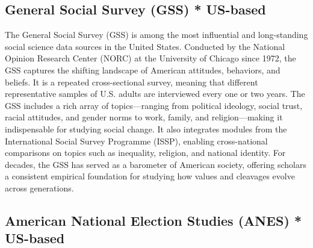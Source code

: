 \documentclass[
  letterpaper,
  DIV=11,
  numbers=noendperiod]{scrreprt}
\begin{document}
\subsection{General Social Survey (GSS) *
US-based}\label{general-social-survey-gss-us-based}

The General Social Survey (GSS) is among the most influential and
long-standing social science data sources in the United States.
Conducted by the National Opinion Research Center (NORC) at the
University of Chicago since 1972, the GSS captures the shifting
landscape of American attitudes, behaviors, and beliefs. It is a
repeated cross-sectional survey, meaning that different representative
samples of U.S. adults are interviewed every one or two years. The GSS
includes a rich array of topics---ranging from political ideology,
social trust, racial attitudes, and gender norms to work, family, and
religion---making it indispensable for studying social change. It also
integrates modules from the International Social Survey Programme
(ISSP), enabling cross-national comparisons on topics such as
inequality, religion, and national identity. For decades, the GSS has
served as a barometer of American society, offering scholars a
consistent empirical foundation for studying how values and cleavages
evolve across generations.

\subsection{American National Election Studies (ANES) *
US-based}\label{american-national-election-studies-anes-us-based}
\end{document}
